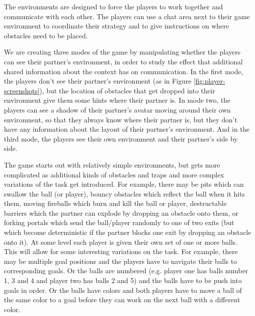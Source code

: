 
The environments are designed to force the players to work together
and communicate with each other.  The players can use a chat area next
to their game environment to coordinate their strategy and to give
instructions on where obstacles need to be placed.



We are creating three modes of the game by manipulating whether the
players can see their partner's environment, in order to study the
effect that additional shared information about the context has on
communication.  In the first mode, the players don't see their
partner's environment (as in Figure \ref{fig:player-screenshots}), but
the location of obstacles that get dropped into their environment give
them some hints where their partner is. In mode two, the players can
see a shadow of their partner's avatar moving around their own
environment, so that they always know where their partner is, but they
don't have any information about the layout of their partner's
environment. And in the third mode, the players see their
own environment and their partner's side by side.



The game starts out with relatively simple environments, but gets more
complicated as additional kinds of obstacles and traps and more
complex variations of the task get introduced.  For example, there may
be pits which can swallow the ball (or player), bouncy obstacles which
reflect the ball when it hits them, moving fireballs which burn and
kill the ball or player, destructable barriers which the partner can
explode by dropping an obstacle onto them, or forking portals which
send the ball/player randomly to one of two exits (but which become
deterministic if the partner blocks one exit by dropping an obstacle
onto it).   At some level
each player is given their own set of one or more balls. This will
allow for some interesting variations on the task. For example, there
may be multiple goal positions and the players have to navigate their
balls to corresponding goals. Or the balls are numbered (e.g. player
one has balls number 1, 3 and 4 and player two has balls 2 and 5) and
the balls have to be push into goals in order. Or the balls have
colors and both players have to move a ball of the same color to a
goal before they can work on the next ball with a different color.
